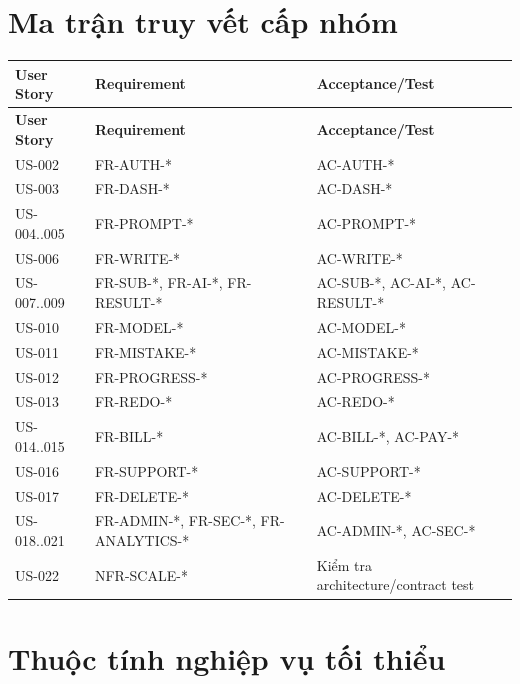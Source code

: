 \documentclass[11pt,a4paper]{article}
\begin{document}
\section{Ma trận truy vết cấp nhóm}
\small
\setlength{\tabcolsep}{4pt}
\renewcommand{\arraystretch}{1.18}
\begin{longtable}{|P{0.18\textwidth}|P{0.36\textwidth}|P{0.38\textwidth}|}
\hline
\textbf{User Story} & \textbf{Requirement} & \textbf{Acceptance/\allowbreak{}Test} \\ \hline
\endfirsthead
\hline
\textbf{User Story} & \textbf{Requirement} & \textbf{Acceptance/\allowbreak{}Test} \\ \hline
\endhead
US-002 & FR-AUTH-* & AC-AUTH-* \\ \hline
US-003 & FR-DASH-* & AC-DASH-* \\ \hline
US-004..005 & FR-PROMPT-* & AC-PROMPT-* \\ \hline
US-006 & FR-WRITE-* & AC-WRITE-* \\ \hline
US-007..009 & FR-SUB-*, FR-AI-*, FR-RESULT-* & AC-SUB-*, AC-AI-*, AC-RESULT-* \\ \hline
US-010 & FR-MODEL-* & AC-MODEL-* \\ \hline
US-011 & FR-MISTAKE-* & AC-MISTAKE-* \\ \hline
US-012 & FR-PROGRESS-* & AC-PROGRESS-* \\ \hline
US-013 & FR-REDO-* & AC-REDO-* \\ \hline
US-014..015 & FR-BILL-* & AC-BILL-*, AC-PAY-* \\ \hline
US-016 & FR-SUPPORT-* & AC-SUPPORT-* \\ \hline
US-017 & FR-DELETE-* & AC-DELETE-* \\ \hline
US-018..021 & FR-ADMIN-*, FR-SEC-*, FR-ANALYTICS-* & AC-ADMIN-*, AC-SEC-* \\ \hline
US-022 & NFR-SCALE-* & Kiểm tra architecture/\allowbreak{}contract test \\ \hline
\end{longtable}
\normalsize
\appendix
\section{Thuộc tính nghiệp vụ tối thiểu}
\end{document}
